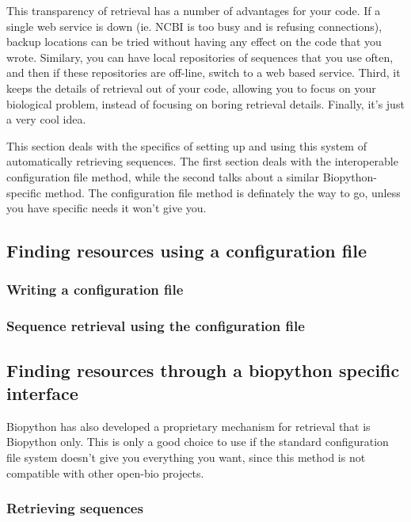 \documentclass{report}
\begin{document}
This transparency of retrieval has a number of advantages for your code.
If a single web service is down (ie. NCBI is too busy
and is refusing connections), backup locations can be tried without
having any effect on the code that you wrote. Similary, you can have
local repositories of sequences that you use often, and then if these
repositories are off-line, switch to a web based service. Third, it
keeps the details of retrieval out of your code, allowing you to focus
on your biological problem, instead of focusing on boring retrieval
details. Finally, it's just a very cool idea.


This section deals with the specifics of setting up and using this
system of automatically retrieving sequences. The first section deals
with the interoperable configuration file method, while the second talks
about a similar Biopython-specific method. The configuration file method
is definately the way to go, unless you have specific needs it won't
give you.

\subsection{Finding resources using a configuration file}

\subsubsection{Writing a configuration file}

\subsubsection{Sequence retrieval using the configuration file}

\subsection{Finding resources through a biopython specific interface}

Biopython has also developed a proprietary mechanism for retrieval that
is Biopython only. This is only a good choice to use if the standard
configuration file system doesn't give you everything you want, since
this method is not compatible with other open-bio projects.

\subsubsection{Retrieving sequences}
\end{document}
